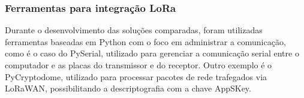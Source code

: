 \subsubsection{Ferramentas para integração LoRa}
Durante o desenvolvimento das soluções comparadas,
foram utilizadas ferramentas baseadas em Python com o foco em administrar a comunicação, como é o caso do PySerial,
utilizado para gerenciar a comunicação serial entre o computador e as placas do transmissor e do receptor. Outro exemplo é o PyCryptodome, utilizado
para processar pacotes de rede trafegados via LoRaWAN, possibilitando a descriptografia com a chave AppSKey.